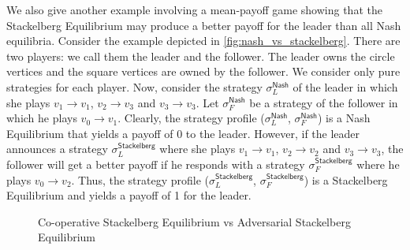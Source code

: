 We also give another example involving a mean-payoff game showing that the Stackelberg Equilibrium may produce a better payoff for the leader than all Nash equilibria. Consider the example depicted in \cref{fig:nash_vs_stackelberg}. There are two players: we call them the leader and the follower. The leader owns the circle vertices and the square vertices are owned by the follower. We consider only pure strategies for each player. Now, consider the strategy $\sigma_L^{\mathsf{Nash}}$ of the leader in which she plays $v_1 \to v_1$, $v_2 \to v_3$ and $v_3 \to v_3$. Let $\sigma_F^{\mathsf{Nash}}$ be a strategy of the follower in which he plays $v_0 \to v_1$. Clearly, the strategy profile ($\sigma_L^{\mathsf{Nash}}$, $\sigma_F^{\mathsf{Nash}}$) is a Nash Equilibrium that yields a payoff of 0 to the leader. However, if the leader announces a strategy $\sigma_L^{\mathsf{Stackelberg}}$ where she plays $v_1 \to v_1$, $v_2 \to v_2$ and $v_3 \to v_3$, the follower will get a better payoff if he responds with a strategy $\sigma_F^{\mathsf{Stackelberg}}$ where he plays $v_0 \to v_2$. Thus, the strategy profile ($\sigma_L^{\mathsf{Stackelberg}}$, $\sigma_F^{\mathsf{Stackelberg}}$) is a Stackelberg Equilibrium and yields a payoff of 1 for the leader.

\begin{figure}
    \centering
    \caption{Co-operative Stackelberg Equilibrium vs Adversarial Stackelberg Equilibrium}
    \label{fig:co-operative_vs_adversarial}
\end{figure}


